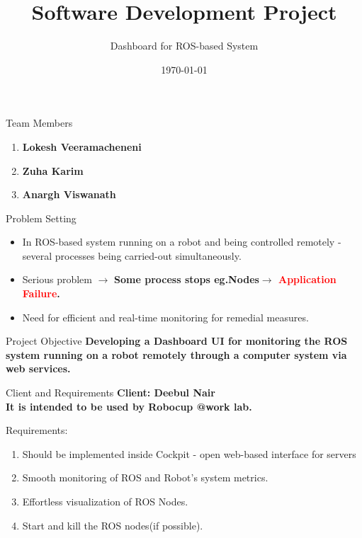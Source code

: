 \documentclass[aspectratio=169]{beamer}
\author[Dashboard for ROS-based System]{}
\title{Software Development Project}
\subtitle{Dashboard for ROS-based System}
\institute[HBRS]{Hochschule Bonn-Rhein-Sieg}
\date{\today}
\begin{document}
{
\begin{frame}
\titlepage
\end{frame}
}

\begin{frame}{Team Members}
\linespread{2}
\vspace*{-20mm}
	\begin{enumerate}
	\item \bf{Lokesh Veeramacheneni}
	\item \bf{Zuha Karim}
	\item \bf{Anargh Viswanath}
	\end{enumerate}
	\vspace*{5mm}
	
\end{frame}

\begin{frame}{Problem Setting}
\vspace*{-15mm}
\begin{itemize}
\item In ROS-based system running on a robot and being controlled remotely - several processes being carried-out simultaneously.
\item Serious problem $\rightarrow$ \bf{Some process stops eg.Nodes$\rightarrow$  \textcolor{red}{Application Failure}}.
\item \textnormal {Need for efficient and real-time monitoring for remedial measures.} 
\end{itemize}

\end{frame}

\begin{frame}{Project Objective}
\vspace*{-15mm}
\justify \bf{Developing a Dashboard UI for monitoring the ROS system running on a robot remotely through a computer system via web services.}
\end{frame}

\begin{frame}{Client and Requirements}
\vspace*{-15mm}
\linespread{1.5}
\bf Client: \textnormal{Deebul Nair}\\
\textnormal{It is intended to be used by \bf{Robocup @work lab}.}

	\textnormal{Requirements:}
	\begin{enumerate}
	\item \textnormal{Should be implemented inside Cockpit - open web-based interface for servers}
	\item \textnormal{Smooth monitoring of ROS and Robot's system metrics.}
	\item \textnormal{Effortless visualization of ROS Nodes.}
	\item \textnormal{Start and kill the ROS nodes(if possible).}
	\end{enumerate}
	
\end{frame}
\end{document}
